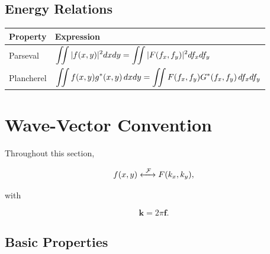 \subsection{Energy Relations}

\begin{center}
\begin{tabular}{ll}
\toprule
Property & Expression\\
\midrule

Parseval &
$\displaystyle
\iint |f(x,y)|^2dxdy=
\iint |F(f_x,f_y)|^2df_x df_y
$

\\[0.5cm]

Plancherel &
$\displaystyle
\iint f(x,y)g^*(x,y)\,dxdy=
\iint F(f_x,f_y)G^*(f_x,f_y)\,df_x df_y
$

\\

\bottomrule
\end{tabular}
\end{center}

\newpage
\section{Wave-Vector Convention}

Throughout this section,

\[
f(x,y)\xleftrightarrow{\ \FT\ }F(\kx,\ky),
\]

with

\[
\mathbf{k}=2\pi\mathbf{f}.
\]

\subsection{Basic Properties}


